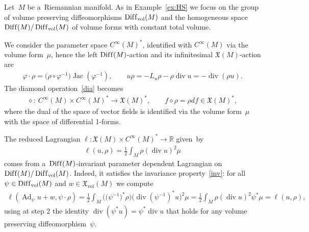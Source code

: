 \documentclass[pdftex]{sigma}
\numberwithin{equation}{section}
\begin{document}
\begin{Example}
Let~$M$ be a~Riemannian manifold.
As in Example~\ref{ex:HS} we focus on the group of volume preserving dif\/feomorphisms
$\operatorname{Dif\/f}_{\operatorname{vol}}(M)$ and the homogeneous space
$\operatorname{Dif\/f}(M)/\operatorname{Dif\/f}_{\operatorname{vol}}(M)$ of volume forms with constant total volume.

We consider the parameter space $C^{\infty}(M)^*$, identif\/ied with $C^{\infty}(M)$ via the volume form~$\mu$, hence the
left $\operatorname{Dif\/f}(M)$-action and its inf\/initesimal $\mathfrak X(M)$-action are
\begin{gather*}
\varphi\cdot\rho=\big(\rho\circ\varphi^{-1}\big)\operatorname{Jac}(\varphi^{-1}),
\qquad
u\rho =-L_u\rho-\rho\operatorname{div} u=-\operatorname{div}(\rho u).
\end{gather*}
The diamond operation~\eqref{dia} becomes
\begin{gather*}
\diamond: \ C^{\infty}(M)\times C^{\infty}(M)^*\to\mathfrak X(M)^*,
\qquad
f\diamond\rho=\rho df\in\mathfrak X(M)^*,
\end{gather*}
where the dual of the space of vector f\/ields is identif\/ied via the volume form~$\mu$ with the space of dif\/ferential 1-forms.

The reduced Lagrangian $\ell:\mathfrak X(M)\times C^{\infty}(M)^*\to\mathbb R$ given~by
\begin{gather*}
\ell(u,\rho)=\frac12\int_M\rho(\operatorname{div} u)^2\mu
\end{gather*}
comes from a~$\operatorname{Dif\/f}(M)$-invariant parameter dependent Lagrangian on
$\operatorname{Dif\/f}(M)/\operatorname{Dif\/f}_{\operatorname{vol}}(M)$.
Indeed, it satisf\/ies the invariance property~\eqref{inv}: for all $\psi\in\operatorname{Dif\/f}_{\operatorname{vol}}(M)$
and $w\in\mathfrak X_{\operatorname{vol}}(M)$ we compute
\begin{gather*}
\ell(\operatorname{Ad}_\psi u+w,\psi\cdot\rho)
=\frac12\int_M\big(\big(\psi^{-1}\big)^*\rho\big)\big(\operatorname{div}(\psi^{-1})^*u\big)^2\mu
=\frac12\int_M\rho(\operatorname{div} u)^2\psi^*\mu=\ell(u,\rho),
\end{gather*}
using at step 2 the identity $\operatorname{div}(\psi^*u)=\psi^*\operatorname{div} u$ that holds for any volume
preserving dif\/feo\-mor\-phism~$\psi$.


\end{Example}
\end{document}
